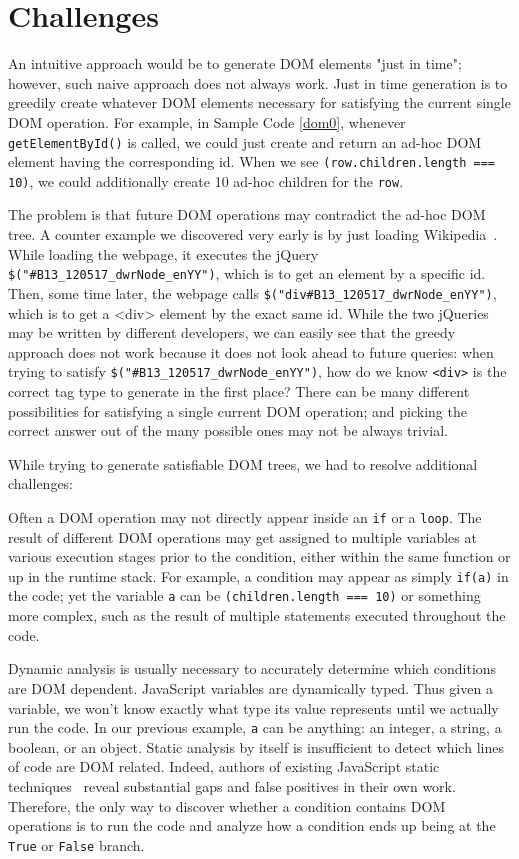 \section{Challenges}
An intuitive approach would be to generate DOM elements "just in time"; however, such naive approach does not always work.  
Just in time generation is to greedily create whatever DOM elements necessary for satisfying the current single DOM operation.  
For example, in Sample Code \ref{dom0}, whenever {\tt getElementById()} is called, we could just create and return an ad-hoc DOM element having the corresponding id.  
When we see {\tt (row.children.length === 10)}, we could additionally create 10 ad-hoc children for the {\tt row}.  

The problem is that future DOM operations may contradict the ad-hoc DOM tree.  
A counter example we discovered very early is by just loading Wikipedia~\cite{wikipedia}.  
While loading the webpage, it executes the jQuery {\tt \$("\#B13\_120517\_dwrNode\_enYY")}, which is to get an element by a specific id.  
Then, some time later, the webpage calls {\tt \$("div\#B13\_120517\_dwrNode\_enYY")}, which is to get a <div> element by the exact same id.  
While the two jQueries may be written by different developers, we can easily see that the greedy approach does not work because it does not look ahead to future queries: when trying to satisfy {\tt \$("\#B13\_120517\_dwrNode\_enYY")}, how do we know {\tt <div>} is the correct tag type to generate in the first place?  
There can be many different possibilities for satisfying a single current DOM operation; and picking the correct answer out of the many possible ones may not be always trivial.  

While trying to generate satisfiable DOM trees, we had to resolve additional challenges:  

Often a DOM operation may not directly appear inside an {\tt if} or a {\tt loop}.  
The result of different DOM operations may get assigned to multiple variables at various execution stages prior to the condition, either within the same function or up in the runtime stack.  
For example, a condition may appear as simply {\tt if(a)} in the code; yet the variable {\tt a} can be {\tt (children.length === 10)} or something more complex, such as the result of multiple statements executed throughout the code.  


Dynamic analysis is usually necessary to accurately determine which conditions are DOM dependent.  
JavaScript variables are dynamically typed.  Thus given a variable, we won't know exactly what type its value represents until we actually run the code.  
In our previous example, {\tt a} can be anything: an integer, a string, a boolean, or an object.  
Static analysis by itself is insufficient to detect which lines of code are DOM related.
Indeed, authors of existing JavaScript static techniques~\cite{staticJsWWW09, staticJsWWW11} reveal substantial gaps and false positives in their own work.  
Therefore, the only way to discover whether a condition contains DOM operations is to run the code and analyze how a condition ends up being at the {\tt True} or {\tt False} branch.

